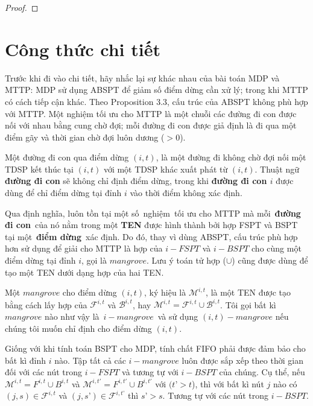\documentclass[../main.tex]{subfiles}
\begin{document}
\begin{proof} \end{proof}

\section{Công thức chi tiết}\label{cong-thuc2}

Trước khi đi vào chi tiết, hãy nhắc lại sự khác nhau của bài toán MDP và
MTTP: MDP sử dụng ABSPT để giảm số điểm dừng cần xử lý; trong khi MTTP
có cách tiếp cận khác. Theo Proposition 3.3, cấu trúc của ABSPT không
phù hợp với MTTP. Một nghiệm tối ưu cho MTTP là một chuỗi các đường đi
con được nối với nhau bằng cung chờ đợi; mỗi đường đi con được giả định
là đi qua một điểm gãy và thời gian chờ đợi luôn dương (\(>0\)).

\begin{definition}
\label{def:duong-di-con}
Một đường đi con qua điểm
dừng \((i, t)\), là một đường đi không chờ đợi nối một TDSP kết thúc tại
\((i, t)\) với một TDSP khác xuất phát từ \((i, t)\). Thuật ngữ
\textbf{đường đi con} sẽ không chỉ định điểm dừng, trong khi
\textbf{đường đi con \(i\)} được dùng để chỉ điểm dừng tại đỉnh \(i\)
vào thời điểm không xác định.
\end{definition}

Qua định nghĩa, luôn tồn tại một số~nghiệm~tối ưu cho MTTP mà
mỗi~\textbf{đường đi con}~của nó nằm trong một \textbf{TEN} được hình
thành bởi hợp FSPT và BSPT tại một~\textbf{điểm dừng}~xác định. Do đó,
thay vì dùng ABSPT, cấu trúc phù hợp hơn sử dụng để giải cho MTTP là hợp
của \(i-FSPT\) và \(i-BSPT\) cho cùng một điểm dừng tại đỉnh \(i\), gọi
là \(mangrove\). Lưu ý toán tử hợp (\(\cup\)) cũng được dùng để tạo một
TEN dưới dạng hợp của hai TEN.

\begin{definition}
\label{def:mangrove}
Một \(mangrove\) cho điểm dừng \((i, t)\), ký
hiệu là \(\mathcal M ^{i,t}\), là một TEN được tạo bằng cách lấy hợp của
\(\mathcal F^{i,t}\) và \(\mathcal B ^{i,t}\), hay
\(\mathcal M ^{i,t} = \mathcal F ^{i,t} \cup \mathcal B ^{i,t}\). Tôi gọi bất kì
\(mangrove\) nào như vậy là~\(i-mangrove\)~và sử dụng
\((i, t)-mangrove\) nếu chúng tôi muốn chỉ định cho điểm dừng
\((i, t)\).
\end{definition}

Giống với khi tính toán BSPT cho MDP, tính chất FIFO phải được đảm bảo
cho bất kì đỉnh \(i\) nào. Tập tất cả các \(i-mangrove\) luôn được sắp
xếp theo thời gian đối với các nút trong \(i-FSPT\) và tương tự với
\(i-BSPT\) của chúng. Cụ thể, nếu \(\mathcal M^{i, t}=F^{i,t}\cup B^{i,t}\)
và \(\mathcal M^{i, t'}=F^{i,t'}\cup B^{i,t'}\) với \((t’ > t\)), thì với
bất kì nút \(j\) nào có \((j,s) \in \mathcal F^{i, t}\) và
\((j,s’) \in \mathcal F^{i, t’}\) thì \(s’ > s\). Tương tự với các nút trong
\(i-BSPT\).
\end{document}
